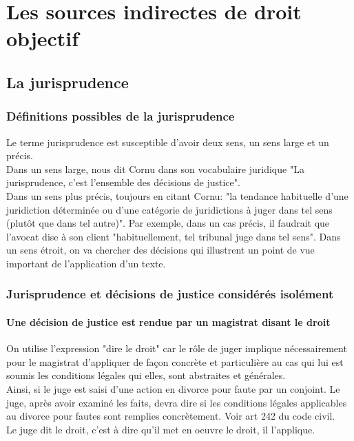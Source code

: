 \part{Les sources indirectes de droit objectif}

\chapter{La jurisprudence}
\section{Définitions possibles de la jurisprudence}
Le terme jurisprudence est susceptible d'avoir deux sens, un sens large et un précis. \\
Dans un sens large, nous dit Cornu dans son vocabulaire juridique "La jurisprudence, c'est l'ensemble des décisions de justice". \\
Dans un sens plus précis, toujours en citant Cornu: "la tendance habituelle d'une juridiction déterminée ou d'une catégorie de juridictions à juger dans tel sens (plutôt que dans tel autre)". Par exemple, dans un cas précis, il faudrait que l'avocat dise à son client "habituellement, tel tribunal juge dans tel sens". Dans un sens étroit, on va chercher des décisions qui illustrent un point de vue important de l'application d'un texte.

\section{Jurisprudence et décisions de justice considérés isolément}

\subsection{Une décision de justice est rendue par un magistrat disant le droit}

On utilise l'expression "dire le droit" car le rôle de juger implique nécessairement pour le magistrat d'appliquer de façon concrète et particulière au cas qui lui est soumis les conditions légales qui elles, sont abstraites et générales. \\
Ainsi, si le juge est saisi d'une action en divorce pour faute par un conjoint. Le juge, après avoir examiné les faits, devra dire si les conditions légales applicables au divorce pour fautes sont remplies concrètement. Voir art 242 du code civil. \\
Le juge dit le droit, c'est à dire qu'il met en oeuvre le droit, il l'applique.


